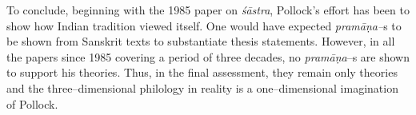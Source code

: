 To conclude, beginning with the 1985 paper on \textit{śāstra}, Pollock’s effort has been to show how Indian tradition viewed itself. One would have expected \textit{pramāṇa–}s to be shown from Sanskrit texts to substantiate thesis statements. However, in all the papers since 1985 covering a period of three decades, no \textit{pramāṇa}–s are shown to support his theories. Thus, in the final assessment, they remain only theories and the three–dimensional philology in reality is a one–dimensional imagination of Pollock.

